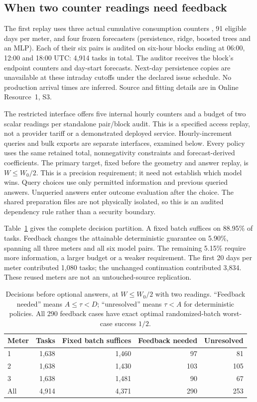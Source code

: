 \subsection{When two counter readings need feedback}
\label{sec:counter-precision-results}
The first replay uses three actual cumulative consumption counters \citep{blem}, 91
eligible days per meter, and four frozen forecasters (persistence, ridge,
boosted trees and an MLP). Each of their six pairs is audited on six-hour
blocks ending at 06:00, 12:00 and 18:00 UTC: 4,914 tasks in total.
The auditor receives the block's endpoint counters and day-start forecasts.
Next-day persistence copies are unavailable at these intraday cutoffs under
the declared issue schedule. No production arrival times are inferred.
Source and fitting details are in Online Resource~1, S3.

The restricted interface offers five internal hourly counters and a budget
of two scalar readings per standalone pair/block audit. This is a specified
access replay, not a provider tariff or a demonstrated deployed service.
Hourly-increment queries and bulk exports are separate interfaces, examined
below. Every policy uses the same retained total, nonnegativity constraints
and forecast-derived coefficients. The primary target, fixed before the
geometry and answer replay, is $W\leq W_0/2$. This is a precision requirement;
it need not establish which model wins. Query choices use only permitted
information and previous queried answers. Unqueried answers enter outcome
evaluation after the choice. The shared preparation files are not physically
isolated, so this is an audited dependency rule rather than a security boundary.

Table~\ref{tab:counter-guarantees} gives the complete decision partition.
A fixed batch suffices on 88.95\% of tasks. Feedback changes the attainable
deterministic guarantee on 5.90\%, spanning all three meters and all six
model pairs. The remaining 5.15\% require more information, a larger budget
or a weaker requirement. The first 20 days per meter contributed 1,080 tasks;
the unchanged continuation contributed 3,834. These reused meters are not
an untouched-source replication.

\begin{table}[htbp]\centering\small
\caption{Decisions before optional answers, at $W\leq W_0/2$ with two
readings. ``Feedback needed'' means $A\leq\tau<D$; ``unresolved'' means
$\tau<A$ for deterministic policies. All 290 feedback cases have exact
optimal randomized-batch worst-case success $1/2$.}
\label{tab:counter-guarantees}
\begin{tabular}{lrrrr}\toprule
Meter & Tasks & Fixed batch suffices & Feedback needed & Unresolved\\\midrule
1 & 1,638 & 1,460 & 97 & 81\\
2 & 1,638 & 1,430 & 103 & 105\\
3 & 1,638 & 1,481 & 90 & 67\\
All & 4,914 & 4,371 & 290 & 253\\\bottomrule
\end{tabular}\end{table}

